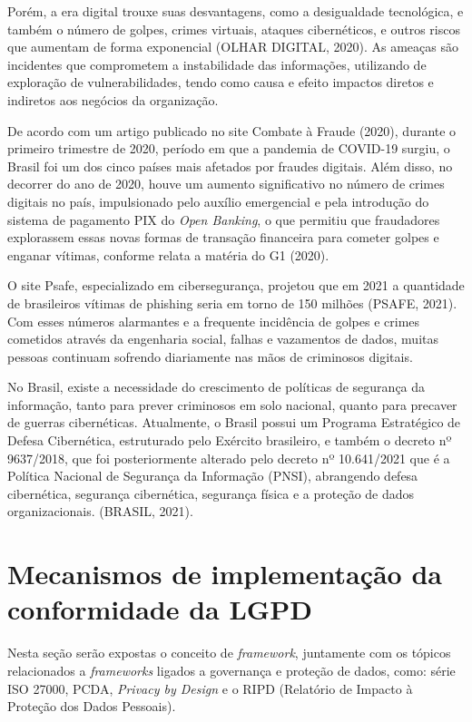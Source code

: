 \documentclass[
	12pt,				%
	openright,			%
	oneside,			%
	a4paper,			%
	english,			%
	french,				%
	spanish,			%
	brazil,				%
	]{abntex2}
\begin{document}
Porém, a era digital trouxe suas desvantagens, como a desigualdade tecnológica, e também o número de golpes, crimes virtuais, ataques cibernéticos, e outros riscos que aumentam de forma exponencial (OLHAR DIGITAL, 2020). As ameaças são incidentes que comprometem a instabilidade das informações, utilizando de exploração de vulnerabilidades, tendo como causa e efeito impactos diretos e indiretos aos negócios da organização.

De acordo com um artigo publicado no site Combate à Fraude (2020), durante o primeiro trimestre de 2020, período em que a pandemia de COVID-19 surgiu, o Brasil foi um dos cinco países mais afetados por fraudes digitais. Além disso, no decorrer do ano de 2020, houve um aumento significativo no número de crimes digitais no país, impulsionado pelo auxílio emergencial e pela introdução do sistema de pagamento PIX do \textit{Open Banking}, o que permitiu que fraudadores explorassem essas novas formas de transação financeira para cometer golpes e enganar vítimas, conforme relata a matéria do G1 (2020).

O site Psafe, especializado em cibersegurança, projetou que em 2021 a quantidade de brasileiros vítimas de phishing seria em torno de 150 milhões (PSAFE, 2021). Com esses números alarmantes e a frequente incidência de golpes e crimes cometidos através da engenharia social, falhas e vazamentos de dados, muitas pessoas continuam sofrendo diariamente nas mãos de criminosos digitais.

No Brasil, existe a necessidade do crescimento de políticas de segurança da informação, tanto para prever criminosos em solo nacional, quanto para precaver de guerras cibernéticas. Atualmente, o Brasil possui um Programa Estratégico de Defesa Cibernética, estruturado pelo Exército brasileiro, e também o decreto nº 9637/2018, que foi posteriormente alterado pelo decreto nº 10.641/2021 que é a Política Nacional de Segurança da Informação (PNSI), abrangendo defesa cibernética, segurança cibernética, segurança física e a proteção de dados organizacionais. (BRASIL, 2021).

\section{Mecanismos de implementação da conformidade da LGPD}

Nesta seção serão expostas o conceito de \textit{framework}, juntamente com os tópicos relacionados a \textit{frameworks} ligados a governança e proteção de dados, como: série ISO 27000, PCDA, \textit{Privacy by Design} e o RIPD (Relatório de Impacto à Proteção dos Dados Pessoais). 
\end{document}
